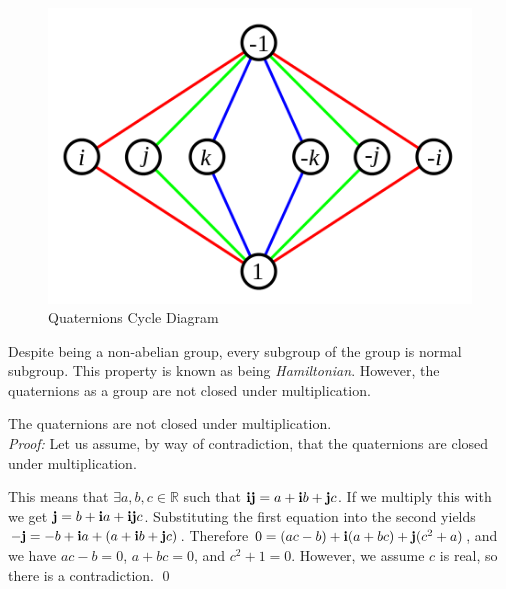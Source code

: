 \begin{figure}[H]
\centering
\includegraphics[width = .75\textwidth]{Figures/cycle.png}
\caption{Quaternions Cycle Diagram}
\label{fig:cycle}
\end{figure}
Despite being a non-abelian group, every subgroup of the group is normal subgroup.
This property is known as being \textit{Hamiltonian}.
However, the quaternions as a group are not closed under multiplication.
\begin{thm} The quaternions are not closed under multiplication.
\noindent \\ \textit{Proof:}
Let us assume, by way of contradiction, that the quaternions are closed under multiplication.

This means that $\exists a,b,c \in \mathbb{R}$ such that $\text{\textbf{i}}\text{\textbf{j}} = a + \text{\textbf{i}} b + \text{\textbf{j}} c$.
If we multiply this with \qi we get $\text{\textbf{j}} = b + \text{\textbf{i}} a + \text{\textbf{i}} \text{\textbf{j}} c$.
Substituting the first equation into the second yields $-\text{\textbf{j}} = -b + \text{\textbf{i}} a + (a + \text{\textbf{i}} b + \text{\textbf{j}} c)$.
Therefore $0 = (ac - b) + \text{\textbf{i}}(a + bc) + \text{\textbf{j}}(c^2 + a)$, and we have $ac-b = 0$, $a+bc=0$, and $c^2 + 1 = 0$.
However, we assume $c$ is real, so there is a contradiction. \qed

\end{thm}


